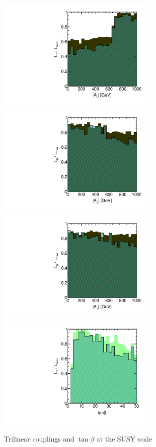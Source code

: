 \begin{figure}[htbp]
\begin{center}
\includegraphics[height=5.5cm]{figs/fig_A_t.pdf} 
\includegraphics[height=5.5cm]{figs/fig_A_b.pdf} \\
\includegraphics[height=5.5cm]{figs/fig_A_tau.pdf}
\includegraphics[height=5.5cm]{figs/fig_tanbeta.pdf}
\caption{Trilinear couplings and $\tan\beta$ at the SUSY scale}
\label{default}
\end{center}
\end{figure}


